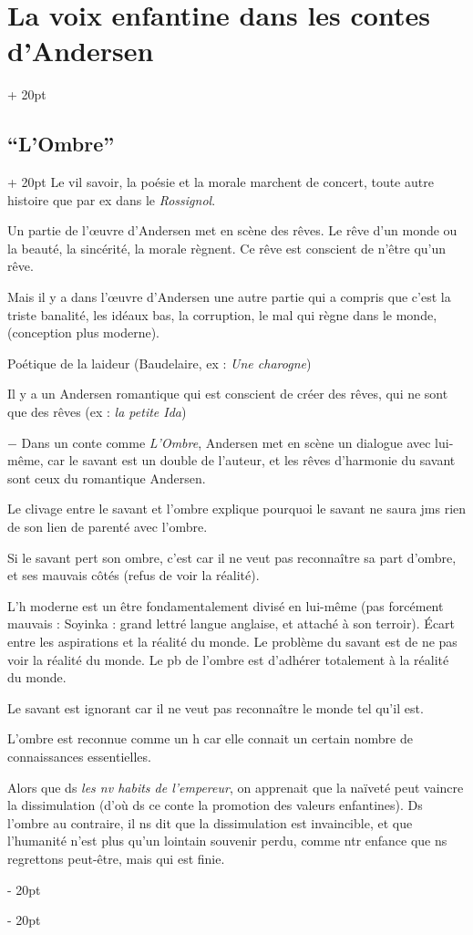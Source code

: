 \documentclass[a4paper, 12pt, twoside]{article}
\newcommand{\ind}[1][20pt]{\advance\leftskip + #1}
\newcommand{\deind}[1][20pt]{\advance\leftskip - #1}
\newenvironment{indt}[2][20pt]{#2 \par \ind[#1]}{\par \deind} %
\begin{document}
\begin{indt}{\section{La voix enfantine dans les contes d'Andersen}}
\begin{indt}{\subsection{``L'Ombre''}}
            Le vil savoir, la poésie et la morale marchent de concert, toute autre histoire que par ex dans le \textit{Rossignol}.
            
            Un partie de l'\oe uvre d'Andersen met en scène des rêves. Le rêve d'un monde ou la beauté, la sincérité, la morale règnent.
            Ce rêve est conscient de n'être qu'un rêve.
            
            Mais il y a dans l'\oe uvre d'Andersen une autre partie qui a compris que c'est la triste banalité, les idéaux bas, la corruption, le mal qui règne dans le monde, (conception plus moderne).
            
            Poétique de la laideur (Baudelaire, ex : \textit{Une charogne})
            
            Il y a un Andersen romantique qui est conscient de créer des rêves, qui ne sont que des rêves (ex : \textit{la petite Ida})
            
            
            \vspace{12pt}
            
            $-$ Dans un conte comme \textit{L'Ombre}, Andersen met en scène un dialogue avec lui-même, car le savant est un double de l'auteur, et les rêves d'harmonie du savant sont ceux du romantique Andersen.
            
            Le clivage entre le savant et l'ombre explique pourquoi le savant ne saura jms rien de son lien de parenté avec l'ombre.
            
            Si le savant pert son ombre, c'est car il ne veut pas reconnaître sa part d'ombre, et ses mauvais côtés (refus de voir la réalité).
            
            L'h moderne est un être fondamentalement divisé en lui-même (pas forcément mauvais : Soyinka : grand lettré langue anglaise, et attaché à son terroir). \'Ecart entre les aspirations et la réalité du monde. Le problème du savant est de ne pas voir la réalité du monde. Le pb de l'ombre est d'adhérer totalement à la réalité du monde.
            
            Le savant est ignorant car il ne veut pas reconnaître le monde tel qu'il est.
            
            L'ombre est reconnue comme un h car elle connait un certain nombre de connaissances essentielles.
            
            Alors que ds \textit{les nv habits de l'empereur}, on apprenait que la naïveté peut vaincre la dissimulation (d'où ds ce conte la promotion des valeurs enfantines). Ds l'ombre au contraire, il ns dit que la dissimulation est invaincible, et que l'humanité n'est plus qu'un lointain souvenir perdu, comme ntr enfance que ns regrettons peut-être, mais qui est finie.
            

\end{indt}
\end{indt}
\end{document}
